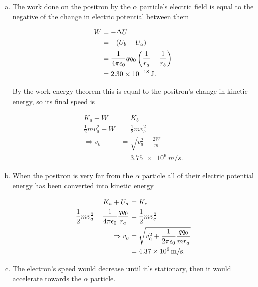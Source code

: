 \documentclass{article}
\begin{document}
\begin{enumerate}[a)]
  \item The work done on the positron by the $\alpha$ particle's electric field is equal to the negative of the change in electric potential between them

        \begin{align*}
          W & = -\Delta U                                              \\
            & = -(U_b - U_a)                                           \\
            & = \frac{1}{4 \pi \epsilon_0} q q_0 \left( \frac{1}{r_a} - \frac{1}{r_b} \right) \\
            & = \qty{2.30e-18}{J}.
        \end{align*}

        By the work-energy theorem this is equal to the positron's change in kinetic energy, so its final speed is

        \begin{align*}
          K_a + W                 & = K_b                          \\
          \frac{1}{2} m v_a^2 + W & = \frac{1}{2} m v_b^2          \\
          \Rightarrow v_b         & = \sqrt{v_a^2 + \frac{2 W}{m}} \\
                                  & = \qty{3.75e6}{m/s}.
        \end{align*}

  \item When the positron is very far from the $\alpha$ particle all of their electric potential energy has been converted into kinetic energy

        \begin{align*}
          K_a + U_a                                   & = K_c                                                           \\
          \frac{1}{2} m v_a^2 + \frac{1}{4 \pi \epsilon_0} \frac{q q_0}{r_a} & = \frac{1}{2} m v_c^2                                           \\
          \Rightarrow v_c                             & = \sqrt{v_a^2 + \frac{1}{2 \pi \epsilon_0} \frac{q q_0}{m r_a}} \\
                                                      & = \qty{4.37e6}{m/s}.
        \end{align*}

  \item The electron's speed would decrease until it's stationary, then it would accelerate towards the $\alpha$ particle.
\end{enumerate}
\end{document}
